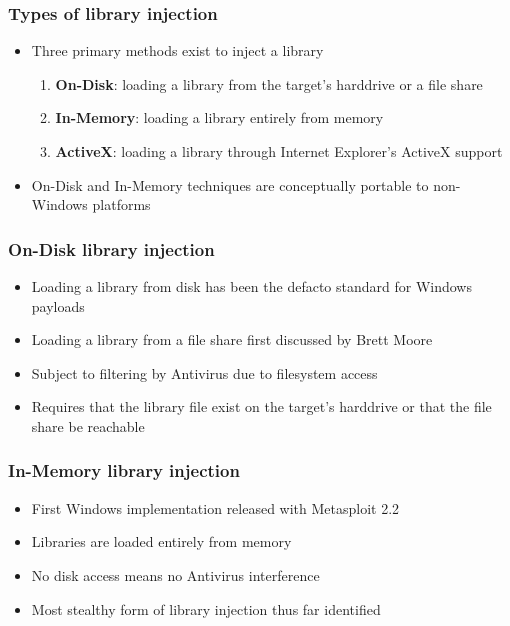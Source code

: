 \documentclass{beamer}
\newenvironment{sitemize}{\vspace{1mm}\begin{itemize}\itemsep 4pt\small}{\end{itemize}}
\newenvironment{senumerate}{\vspace{1mm}\begin{enumerate}\itemsep 4pt\small}{\end{enumerate}}
\begin{document}
\begin{frame}[t]
    \frametitle{Types of library injection}

    \begin{sitemize}
        \item Three primary methods exist to inject a library
        \begin{senumerate}
            \item \textbf{On-Disk}: loading a library from the target's
            harddrive or a file share
            \item \textbf{In-Memory}: loading a library entirely from memory
            \item \textbf{ActiveX}: loading a library through Internet
            Explorer's ActiveX support
        \end{senumerate}
        \item On-Disk and In-Memory techniques are conceptually
        portable to non-Windows platforms
    \end{sitemize}
\end{frame}

\begin{frame}[t]
    \frametitle{On-Disk library injection}

    \begin{sitemize}
        \item Loading a library from disk has been the defacto
        standard for Windows payloads
        \item Loading a library from a file share first
        discussed by Brett Moore

        \pause
        \item Subject to filtering by Antivirus due to
            filesystem access
        \item Requires that the library file exist on the target's
            harddrive or that the file share be reachable
    \end{sitemize}
\end{frame}

\begin{frame}[t]
    \frametitle{In-Memory library injection}

    \begin{sitemize}
        \item First Windows implementation released with Metasploit 2.2

        \pause
        \item Libraries are loaded entirely from memory

        \pause
        \item No disk access means no Antivirus interference

        \pause
        \item Most stealthy form of library injection thus far
        identified
    \end{sitemize}
\end{frame}
\end{document}
